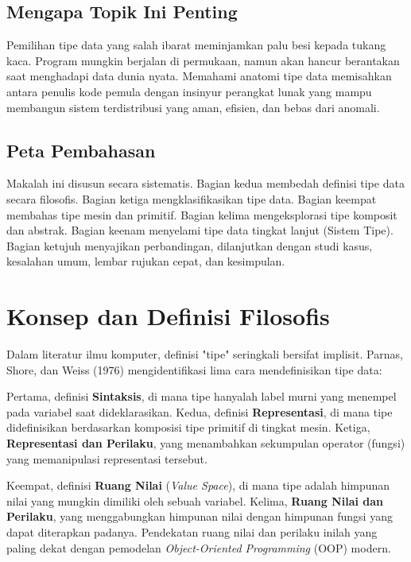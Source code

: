 \documentclass[11pt,a4paper]{article}
\begin{document}
	\subsection{Mengapa Topik Ini Penting}
	
	Pemilihan tipe data yang salah ibarat meminjamkan palu besi kepada tukang kaca. Program mungkin berjalan di permukaan, namun akan hancur berantakan saat menghadapi data dunia nyata. Memahami anatomi tipe data memisahkan antara penulis kode pemula dengan insinyur perangkat lunak yang mampu membangun sistem terdistribusi yang aman, efisien, dan bebas dari anomali.
	
	\subsection{Peta Pembahasan}
	
	Makalah ini disusun secara sistematis. Bagian kedua membedah definisi tipe data secara filosofis. Bagian ketiga mengklasifikasikan tipe data. Bagian keempat membahas tipe mesin dan primitif. Bagian kelima mengeksplorasi tipe komposit dan abstrak. Bagian keenam menyelami tipe data tingkat lanjut (Sistem Tipe). Bagian ketujuh menyajikan perbandingan, dilanjutkan dengan studi kasus, kesalahan umum, lembar rujukan cepat, dan kesimpulan.
	
	\section{Konsep dan Definisi Filosofis}
	
	Dalam literatur ilmu komputer, definisi "tipe" seringkali bersifat implisit. Parnas, Shore, dan Weiss (1976) mengidentifikasi lima cara mendefinisikan tipe data:
	
	Pertama, definisi \textbf{Sintaksis}, di mana tipe hanyalah label murni yang menempel pada variabel saat dideklarasikan. Kedua, definisi \textbf{Representasi}, di mana tipe didefinisikan berdasarkan komposisi tipe primitif di tingkat mesin. Ketiga, \textbf{Representasi dan Perilaku}, yang menambahkan sekumpulan operator (fungsi) yang memanipulasi representasi tersebut.
	
	Keempat, definisi \textbf{Ruang Nilai} (\textit{Value Space}), di mana tipe adalah himpunan nilai yang mungkin dimiliki oleh sebuah variabel. Kelima, \textbf{Ruang Nilai dan Perilaku}, yang menggabungkan himpunan nilai dengan himpunan fungsi yang dapat diterapkan padanya. Pendekatan ruang nilai dan perilaku inilah yang paling dekat dengan pemodelan \textit{Object-Oriented Programming} (OOP) modern.
	
\end{document}
